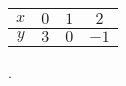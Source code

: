 \begin{tabular}{c|c c c}
\(\displaystyle x\)  & \(\displaystyle 0\)  & \(\displaystyle 1\)  & \(\displaystyle 2\) \\
\hline
\(\displaystyle y\)  & \(\displaystyle 3\)  & \(\displaystyle 0\)  & \(\displaystyle -1\)
\end{tabular}.